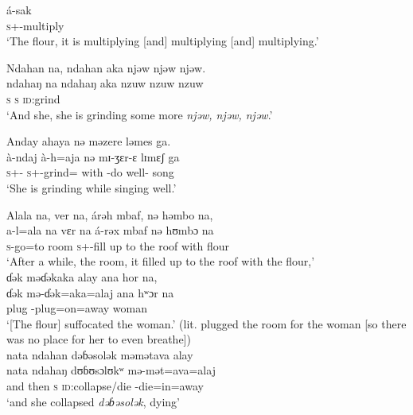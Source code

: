  \medskip
 \gll á-sak\\
      \textsc{s}+{\IFV}-multiply \\
 \glt ‘The flour, it is multiplying [and] multiplying [and] multiplying.’
 \z
 
 \ea  Ndahan  na,  ndahan  aka  {njəw  njəw  njəw.}      \\
 \gll ndahaŋ   na ndahaŋ  aka       {nzuw  nzuw  nzuw}     \\
 \textsc{s}  {\PSP}  \textsc{s}       {\EXT}  \textsc{id}:grind\\
 \glt ‘And she, she is grinding some more \textit{njəw, njəw, njəw}.’
 \z
 
 \ea  Anday  ahaya  nə  məzere  ləmes  ga.\\
 \gll à-ndaj             à-h=aja   nə  mɪ-ʒɛr-ɛ         lɪmɛʃ  ga\\
 \textsc{s}+{\PFV}-{\PRG}  \textsc{s}+{\PFV}-grind={\PLU}  with  {\NOM}{}-{do well}-{\CL}  song     {\ADJ}\\
 \glt ‘She is grinding while singing well.’
 \z
 
 \ea  Alala  na, ver  na, árəh  mbaf,  nə  həmbo  na,\\
 \gll a-l=ala na vɛr na á-rəx       mbaf    nə   hʊmbɔ  na\\
 \textsc{s}-go=to   {\PSP}   room     {\PSP}  \textsc{s}+{\IFV}-fill      {up to the roof}     with    flour  {\PSP}\\
 \glt ‘After a while, the room, it filled up to the roof with the flour,’\\
 
 \medskip\largerpage
  ɗək  məɗəkaka  alay  ana  hor  na,\\
 \gll ɗək         mə-ɗək=aka=alaj   ana      hʷɔr     na\\
 plug   {\NOM}{}-plug=on=away   {\DAT}  woman   {\PSP}\\
 \glt ‘[The flour] suffocated the woman.' (lit. plugged the room for the woman [so there was no place for her to even breathe])\\
 
 \medskip
  nata  ndahan  dəɓəsolək  məmətava  alay  \\
 \gll nata   ndahaŋ  dʊɓʊsɔlʊkʷ mə-mət=ava=alaj \\
 {and then}  \textsc{s}           \textsc{id}:collapse/die    {\NOM}{}-die=in=away   \\
 \glt ‘and she collapsed \textit{dəɓəsolək}, dying’\\

